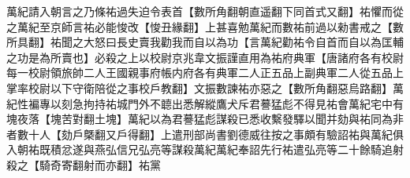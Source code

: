 萬紀請入朝言之乃條祐過失迫令表首【數所角翻朝直遥翻下同首式又翻】祐懼而從之萬紀至京師言祐必能悛改【悛丑緣翻】上甚喜勉萬紀而數祐前過以勑書戒之【數所具翻】祐聞之大怒曰長史賣我勸我而自以為功【言萬紀勸祐令自首而自以為匡輔之功是為所賣也】必殺之上以校尉京兆韋文振謹直用為祐府典軍【唐諸府各有校尉每一校尉領旅帥二人王國親事府帳内府各有典軍二人正五品上副典軍二人從五品上掌率校尉以下守衛陪從之事校戶教翻】文振數諫祐亦惡之【數所角翻惡烏路翻】萬紀性褊專以刻急拘持祐城門外不聼出悉解縱鷹犬斥君謩猛彪不得見祐會萬紀宅中有塊夜落【塊苦對翻土塊】萬紀以為君謩猛彪謀殺已悉收繫發驛以聞并劾與祐同為非者數十人【劾戶槩翻又戶得翻】上遣刑部尚書劉德威往按之事頗有驗詔祐與萬紀俱入朝祐既積忿遂與燕弘信兄弘亮等謀殺萬紀萬紀奉詔先行祐遣弘亮等二十餘騎追射殺之【騎奇寄翻射而亦翻】祐黨